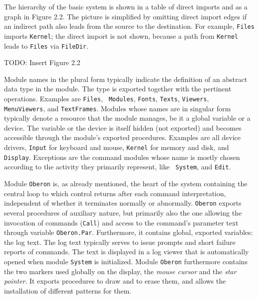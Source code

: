 The hierarchy of the basic system is shown in a table of direct
imports and as a graph in Figure 2.2. The picture is simplified by
omitting direct import edges if an indirect path also leads from the
source to the destination. For example, {\tt Files\/} imports {\tt Kernel\/}; the
direct import is not shown, because a path from {\tt Kernel\/} leads to {\tt Files\/}
via {\tt FileDir\/}.

TODO: Insert Figure 2.2

Module names in the plural form typically indicate the definition of
an abstract data type in the module. The type is exported together
with the pertinent operations. Examples are {\tt Files\/}, {\tt
  Modules\/}, {\tt Fonts\/}, {\tt Texts\/}, {\tt Viewers\/}, {\tt
  MenuViewers\/}, and {\tt TextFrames\/}. Modules whose names are in
singular form typically denote a resource that the module manages, be
it a global variable or a device. The variable or the device is itself
hidden (not exported) and becomes accessible through the module's
exported procedures. Examples are all device drivers, {\tt Input\/}
for keyboard and mouse, {\tt Kernel\/} for memory and disk, and {\tt
  Display\/}. Exceptions are the command modules whose name is mostly
chosen according to the activity they primarily represent, like {\tt
  System\/}, and {\tt Edit\/}.

Module {\tt Oberon\/} is, as already mentioned, the heart of the system
containing the central loop to which control returns after each
command interpretation, independent of whether it terminates normally
or abnormally. {\tt Oberon\/} exports several procedures of auxiliary nature,
but primarily also the one allowing the invocation of commands ({\tt Call\/})
and access to the command's parameter text through variable
{\tt Oberon.Par}. Furthermore, it contains global, exported variables: the
log text. The log text typically serves to issue prompts and short
failure reports of commands. The text is displayed in a log viewer
that is automatically opened when module {\tt System\/} is initialized. Module
{\tt Oberon\/} furthermore contains the two markers used globally on the
display, the {\it mouse cursor\/} and the {\it star pointer\/}. It exports procedures
to draw and to erase them, and allows the installation of different
patterns for them.

